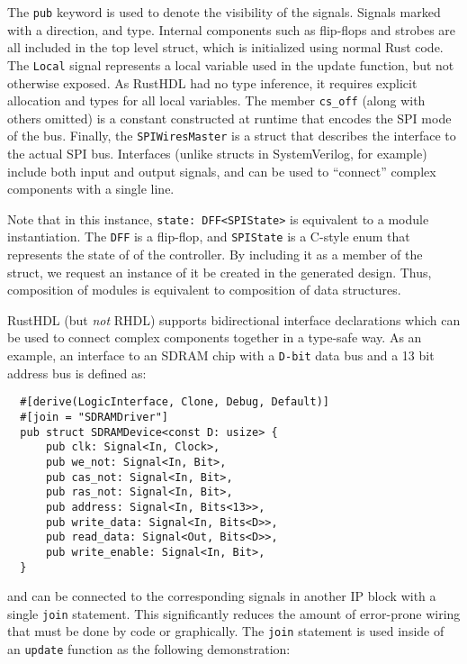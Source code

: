 \documentclass[sigplan,screen,sigconf]{acmart}
\begin{document}
The \verb|pub| keyword is used to denote the visibility of the signals.  Signals 
marked with a direction, and type.  Internal components such as flip-flops and strobes
are all included in the top level struct, which is initialized using normal Rust code.
The \verb|Local| signal represents a local variable used in the update function, but
not otherwise exposed.  As RustHDL had no type inference, it requires explicit allocation
and types for all local variables.  The member \verb|cs_off| (along with others omitted) is a constant constructed at runtime that encodes the SPI mode of the bus.  Finally, 
the \verb|SPIWiresMaster| is a struct that describes the interface to the actual SPI bus.
Interfaces (unlike structs in SystemVerilog, for example) include both input and output
signals, and can be used to ``connect'' complex components with a single line.  

Note that in this instance, \verb|state: DFF<SPIState>| is equivalent to a module instantiation.  The \verb|DFF| is a flip-flop, and \verb|SPIState| is a C-style enum that represents the state of of the controller.  By including it as a member of the struct, we request an instance of it be created in the generated design.  Thus, composition of 
modules is equivalent to composition of data structures.

RustHDL (but \emph{not} RHDL) supports bidirectional interface declarations which can 
be used to connect complex components together in a type-safe way.
As an example, an interface to an SDRAM chip with a \verb|D-bit| data bus and a 13 bit 
address bus is defined as:

\begin{verbatim}
  #[derive(LogicInterface, Clone, Debug, Default)]
  #[join = "SDRAMDriver"]
  pub struct SDRAMDevice<const D: usize> {
      pub clk: Signal<In, Clock>,
      pub we_not: Signal<In, Bit>,
      pub cas_not: Signal<In, Bit>,
      pub ras_not: Signal<In, Bit>,
      pub address: Signal<In, Bits<13>>,
      pub write_data: Signal<In, Bits<D>>,
      pub read_data: Signal<Out, Bits<D>>,
      pub write_enable: Signal<In, Bit>,
  }
\end{verbatim}

and can be connected to the corresponding signals in another IP block with a 
single \verb|join| statement.  This significantly reduces the amount of error-prone wiring that must be done by code or graphically.  The \verb|join| statement is used inside of an \verb|update| function as the following demonstration:
\end{document}

